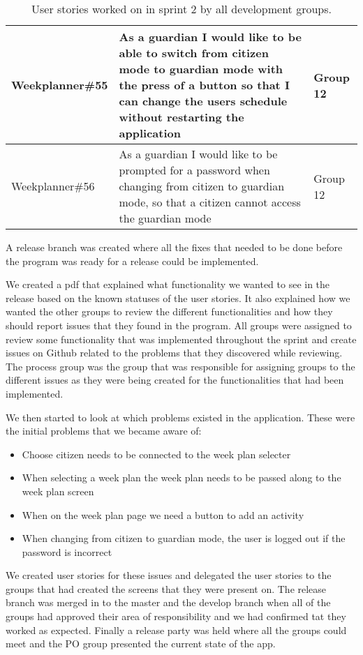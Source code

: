 \begin{table}[H]
\begin{tabular}{|p{2.8cm}|p{7cm}|p{2cm}|}
    Weekplanner\#55 & As a guardian I would like to be able to switch from citizen mode to guardian mode with the press of a button so that I can change the users schedule without restarting the application & Group 12            \\ \hline
    Weekplanner\#56 & As a guardian I would like to be prompted for a password when changing from citizen to guardian mode, so that a citizen cannot access the guardian mode                                  & Group 12            \\ \hline

    \end{tabular}
    \caption{User stories worked on in sprint 2 by all development groups.}\label{table:user-stories-sprint-2-release}
\end{table}

\noindent A release branch was created where all the fixes that needed to be done before the program was ready for a release could be implemented.

\noindent We created a pdf that explained what functionality we wanted to see in the release based on the known statuses of the user stories.
It also explained how we wanted the other groups to review the different functionalities and how they should report issues that they found in the program.
All groups were assigned to review some functionality that was implemented throughout the sprint and create issues on Github related to the problems that they discovered while reviewing. 
The process group was the group that was responsible for assigning groups to the different issues as they were being created for the functionalities that had been implemented. 

\noindent We then started to look at which problems existed in the application.
These were the initial problems that we became aware of:
\begin{itemize}
    \item Choose citizen needs to be connected to the week plan selecter
    \item When selecting a week plan the week plan needs to be passed along to the week plan screen
    \item When on the week plan page we need a button to add an activity
    \item When changing from citizen to guardian mode, the user is logged out if the password is incorrect
\end{itemize}

\noindent We created user stories for these issues and delegated the user stories to the groups that had created the screens that they were present on. 
The release branch was merged in to the master and the develop branch when all of the groups had approved their area of responsibility and we had confirmed tat they worked as expected. 
Finally a release party was held where all the groups could meet and the PO group presented the current state of the app.
